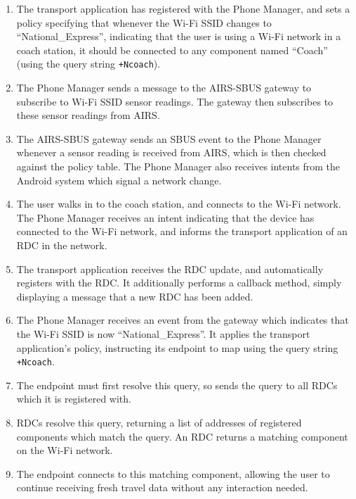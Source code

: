 \documentclass[12pt,twoside,notitlepage]{report}
\begin{document}
\begin{enumerate}

\item The transport application has registered with the Phone Manager, and sets a policy specifying that whenever the Wi-Fi SSID changes to ``National\_Express'', indicating that the user is using a Wi-Fi network in a coach station, it should be connected to any component named ``Coach'' (using the query string {\tt +Ncoach}).   

\item The Phone Manager sends a message to the AIRS-SBUS gateway to subscribe to Wi-Fi SSID sensor readings. The gateway then subscribes to these sensor readings from AIRS. 

\item The AIRS-SBUS gateway sends an SBUS event to the Phone Manager whenever a sensor reading is received from AIRS, which is then checked against the policy table. The Phone Manager also receives intents from the Android system which signal a network change. 

\item The user walks in to the coach station, and connects to the Wi-Fi network. The Phone Manager receives an intent indicating that the device has connected to the Wi-Fi network, and informs the transport application of an RDC in the network. 

\item The transport application receives the RDC update, and automatically registers with the RDC. It additionally performs a callback method, simply displaying a message that a new RDC has been added. 

\item The Phone Manager receives an event from the gateway which indicates that the Wi-Fi SSID is now ``National\_Express''. It applies the transport application's policy, instructing its endpoint to map using the query string {\tt +Ncoach}.

\item The endpoint must first resolve this query, so sends the query to all RDCs which it is registered with. 

\item RDCs resolve this query, returning a list of addresses of registered components which match the query. An RDC returns a matching component on the Wi-Fi network. 

\item The endpoint connects to this matching component, allowing the user to continue receiving fresh travel data without any interaction needed.

\end{enumerate}
\end{document}
